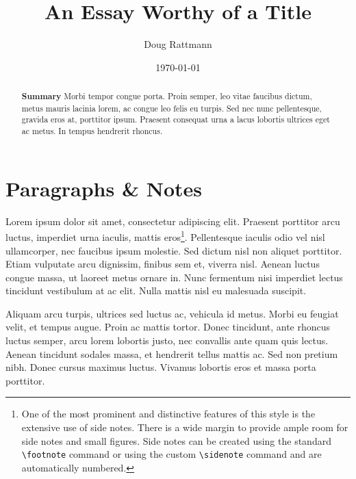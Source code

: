 \documentclass[a4paper]{tufte-handout} %
\title{An Essay Worthy of a Title}
\author{Doug Rattmann}
\date{\today} %
\begin{document}
\maketitle %


\begin{abstract}
	\textbf{Summary}
	Morbi tempor congue porta. Proin semper, leo vitae faucibus dictum, metus mauris lacinia lorem, ac congue leo felis eu turpis. Sed nec nunc pellentesque, gravida eros at, porttitor ipsum. Praesent consequat urna a lacus lobortis ultrices eget ac metus. In tempus hendrerit rhoncus.
\end{abstract}


\section{Paragraphs \& Notes}\label{sec:notes}

Lorem ipsum dolor sit amet, consectetur adipiscing elit. Praesent porttitor arcu luctus, imperdiet urna iaculis, mattis eros\footnote{One of the most prominent and distinctive features of this style is the extensive use of side notes. There is a wide margin to provide ample room for side notes and small figures. Side notes can be created using the standard \texttt{\textbackslash footnote} command or using the custom \texttt{\textbackslash sidenote} command and are automatically numbered.}. Pellentesque iaculis odio vel nisl ullamcorper, nec faucibus ipsum molestie. Sed dictum nisl non aliquet porttitor. Etiam vulputate arcu dignissim, finibus sem et, viverra nisl. Aenean luctus congue massa, ut laoreet metus ornare in. Nunc fermentum nisi imperdiet lectus tincidunt vestibulum at ac elit. Nulla mattis nisl eu malesuada suscipit.

Aliquam arcu turpis, ultrices sed luctus ac, vehicula id metus. Morbi eu feugiat velit, et tempus augue. Proin ac mattis tortor. Donec tincidunt, ante rhoncus luctus semper, arcu lorem lobortis justo, nec convallis ante quam quis lectus. Aenean tincidunt sodales massa, et hendrerit tellus mattis ac. Sed non pretium nibh. Donec cursus maximus luctus. Vivamus lobortis eros et massa porta porttitor.
\end{document}
